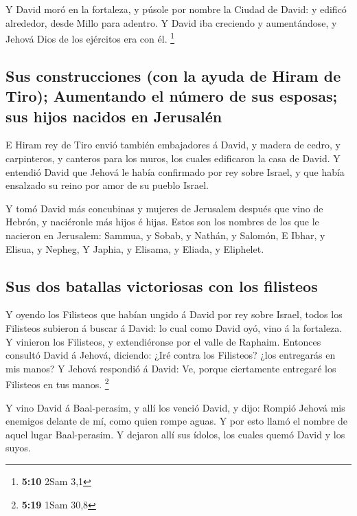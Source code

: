  Y David moró en la fortaleza, y púsole por nombre la
Ciudad de David: y edificó alrededor, desde Millo para adentro.
 Y David iba creciendo y aumentándose, y Jehová Dios de
los ejércitos era con él. \footnote{\textbf{5:10} 2Sam 3,1}

\hypertarget{sus-construcciones-con-la-ayuda-de-hiram-de-tiro-aumentando-el-nuxfamero-de-sus-esposas-sus-hijos-nacidos-en-jerusaluxe9n}{%
\subsection{Sus construcciones (con la ayuda de Hiram de Tiro);
Aumentando el número de sus esposas; sus hijos nacidos en
Jerusalén}\label{sus-construcciones-con-la-ayuda-de-hiram-de-tiro-aumentando-el-nuxfamero-de-sus-esposas-sus-hijos-nacidos-en-jerusaluxe9n}}

 E Hiram rey de Tiro envió también embajadores á David, y
madera de cedro, y carpinteros, y canteros para los muros, los cuales
edificaron la casa de David.  Y entendió David que Jehová
le había confirmado por rey sobre Israel, y que había ensalzado su reino
por amor de su pueblo Israel.

 Y tomó David más concubinas y mujeres de Jerusalem
después que vino de Hebrón, y naciéronle más hijos é hijas.
 Estos son los nombres de los que le nacieron en
Jerusalem: Sammua, y Sobab, y Nathán, y Salomón,  E
Ibhar, y Elisua, y Nepheg,  Y Japhia, y Elisama, y
Eliada, y Eliphelet.

\hypertarget{sus-dos-batallas-victoriosas-con-los-filisteos}{%
\subsection{Sus dos batallas victoriosas con los
filisteos}\label{sus-dos-batallas-victoriosas-con-los-filisteos}}

 Y oyendo los Filisteos que habían ungido á David por rey
sobre Israel, todos los Filisteos subieron á buscar á David: lo cual
como David oyó, vino á la fortaleza.  Y vinieron los
Filisteos, y extendiéronse por el valle de Raphaim. 
Entonces consultó David á Jehová, diciendo: ¿Iré contra los Filisteos?
¿los entregarás en mis manos? Y Jehová respondió á David: Ve, porque
ciertamente entregaré los Filisteos en tus manos. \footnote{\textbf{5:19}
  1Sam 30,8}

 Y vino David á Baal-perasim, y allí los venció David, y
dijo: Rompió Jehová mis enemigos delante de mí, como quien rompe aguas.
Y por esto llamó el nombre de aquel lugar Baal-perasim. 
Y dejaron allí sus ídolos, los cuales quemó David y los suyos.

